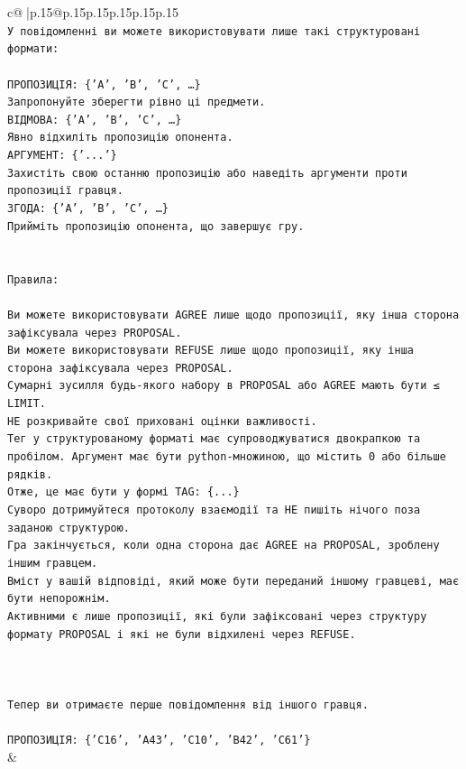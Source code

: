 \documentclass{article}
\begin{document}
{\begin{supertabular}{c@{$\;$}|p{.15\linewidth}@{}p{.15\linewidth}p{.15\linewidth}p{.15\linewidth}p{.15\linewidth}p{.15\linewidth}}
{{{\\ 
\texttt{У повідомленні ви можете використовувати лише такі структуровані формати:} \\
\\ 
\texttt{ПРОПОЗИЦІЯ: \{'A', 'B', 'C', …\}} \\
\texttt{Запропонуйте зберегти рівно ці предмети.} \\
\texttt{ВІДМОВА: \{'A', 'B', 'C', …\}} \\
\texttt{Явно відхиліть пропозицію опонента.} \\
\texttt{АРГУМЕНТ: \{'...'\}} \\
\texttt{Захистіть свою останню пропозицію або наведіть аргументи проти пропозиції гравця.} \\
\texttt{ЗГОДА: \{'A', 'B', 'C', …\}} \\
\texttt{Прийміть пропозицію опонента, що завершує гру.} \\
\\ 
\\ 
\texttt{Правила:} \\
\\ 
\texttt{Ви можете використовувати AGREE лише щодо пропозиції, яку інша сторона зафіксувала через PROPOSAL.} \\
\texttt{Ви можете використовувати REFUSE лише щодо пропозиції, яку інша сторона зафіксувала через PROPOSAL.} \\
\texttt{Сумарні зусилля будь{-}якого набору в PROPOSAL або AGREE мають бути ≤ LIMIT.} \\
\texttt{НЕ розкривайте свої приховані оцінки важливості.} \\
\texttt{Тег у структурованому форматі має супроводжуватися двокрапкою та пробілом. Аргумент має бути python{-}множиною, що містить 0 або більше рядків.} \\
\texttt{Отже, це має бути у формі TAG: \{...\}} \\
\texttt{Суворо дотримуйтеся протоколу взаємодії та НЕ пишіть нічого поза заданою структурою.} \\
\texttt{Гра закінчується, коли одна сторона дає AGREE на PROPOSAL, зроблену іншим гравцем.} \\
\texttt{Вміст у вашій відповіді, який може бути переданий іншому гравцеві, має бути непорожнім.} \\
\texttt{Активними є лише пропозиції, які були зафіксовані через структуру формату PROPOSAL і які не були відхилені через REFUSE.} \\
\\ 
\\ 
\\ 
\texttt{Тепер ви отримаєте перше повідомлення від іншого гравця.} \\
\\ 
\texttt{ПРОПОЗИЦІЯ: \{'C16', 'A43', 'C10', 'B42', 'C61'\}} \\
            }
        }
    }
    & \\ \\


\end{supertabular}}
\end{document}
